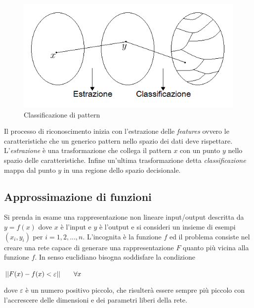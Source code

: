 \documentclass[12pt,a4paper,oneside]{book}
\begin{document}
		\begin{figure}[h]
			\centering
			\includegraphics[width=0.7\linewidth]{IMMAGINI/classificazione}
			\caption{ Classificazione di pattern }
			\label{fig:classificazione}
		\end{figure}
		
		Il processo di riconoscimento inizia con l'estrazione delle \emph{features} ovvero le caratteristiche che un generico pattern nello spazio dei dati deve rispettare. L'\emph{estrazione} è una trasformazione che collega il pattern $x$ con un punto $y$ nello spazio delle caratteristiche. Infine un'ultima trasformazione detta \emph{classificazione} mappa dal punto $y$ in una regione dello spazio decisionale.\\
		
		\subsection{Approssimazione di funzioni}
		
		Si prenda in esame una rappresentazione non lineare input/output descritta da $y=f(x)$ dove $x$ è l'input e $y$ è l'output e si consideri un insieme di esempi ${(x_{i},y_{i} )}$ per $i=1, 2, ..., n$. L'incognita è la funzione $f$ ed il problema consiste nel creare una rete capace di generare una rappresentazione $F$ quanto più vicina alla funzione $f$. In senso euclidiano bisogna soddisfare la condizione\\
		
		\begin{center} $ ||F(x)-f(x)<\varepsilon|| \hspace{0,7cm} \forall x $ \end{center}
		
		dove $\varepsilon$ è un numero positivo piccolo, che risulterà essere sempre più piccolo con l'accrescere delle dimensioni e dei parametri liberi della rete. 
		
	
	
		
		
		
		
\end{document}
